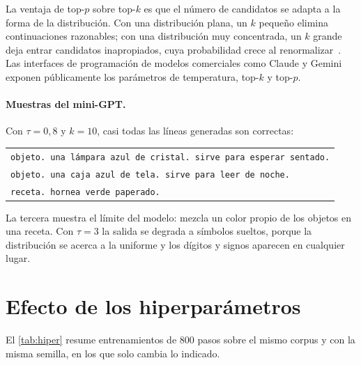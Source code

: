 La ventaja de top-$p$ sobre top-$k$ es que el número de candidatos se adapta a la forma de la distribución. Con una distribución plana, un $k$ pequeño elimina continuaciones razonables; con una distribución muy concentrada, un $k$ grande deja entrar candidatos inapropiados, cuya probabilidad crece al renormalizar~\cite[§3.2]{holtzman}. Las interfaces de programación de modelos comerciales como Claude y Gemini exponen públicamente los parámetros de temperatura, top-$k$ y top-$p$.

\paragraph{Muestras del mini-GPT.} Con $\tau=0{,}8$ y $k=10$, casi todas las líneas generadas son correctas:
\begin{center}\small
\begin{tabular}{@{}l@{}}
\texttt{objeto. una lámpara azul de cristal. sirve para esperar sentado.}\\
\texttt{objeto. una caja azul de tela. sirve para leer de noche.}\\
\texttt{receta. hornea verde paperado.}
\end{tabular}
\end{center}
La tercera muestra el límite del modelo: mezcla un color propio de los objetos en una receta. Con $\tau=3$ la salida se degrada a símbolos sueltos, porque la distribución se acerca a la uniforme y los dígitos y signos aparecen en cualquier lugar.

\section{Efecto de los hiperparámetros}

El \cref{tab:hiper} resume entrenamientos de 800 pasos sobre el mismo corpus y con la misma semilla, en los que solo cambia lo indicado.

